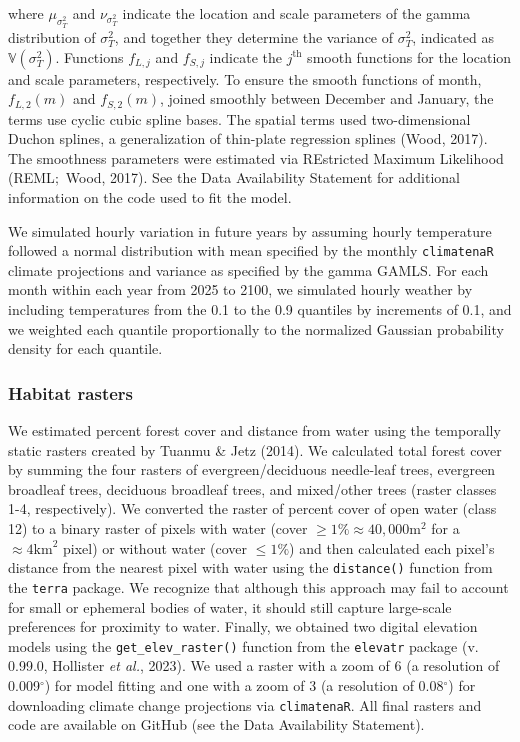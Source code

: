 \documentclass[
  12pt,
]{article}
\begin{document}
\noindent where \(\mu_{\sigma^2_T}\) and \(\nu_{\sigma^2_T}\) indicate the location and scale parameters of the gamma distribution of \(\sigma^2_T\), and together they determine the variance of \(\sigma^2_T\), indicated as \(\mathbb V(\sigma^2_T)\). Functions \(f_{L,j}\) and \(f_{S,j}\) indicate the \(j^\text{th}\) smooth functions for the location and scale parameters, respectively. To ensure the smooth functions of month, \(f_{L,2}(m)\) and \(f_{S,2}(m)\), joined smoothly between December and January, the terms use cyclic cubic spline bases. The spatial terms used two-dimensional Duchon splines, a generalization of thin-plate regression splines (Wood, 2017). The smoothness parameters were estimated via REstricted Maximum Likelihood (REML\(;\) Wood, 2017). See the Data Availability Statement for additional information on the code used to fit the model.

We simulated hourly variation in future years by assuming hourly temperature followed a normal distribution with mean specified by the monthly \texttt{climatenaR} climate projections and variance as specified by the gamma GAMLS. For each month within each year from 2025 to 2100, we simulated hourly weather by including temperatures from the 0.1 to the 0.9 quantiles by increments of 0.1, and we weighted each quantile proportionally to the normalized Gaussian probability density for each quantile.

\subsubsection{Habitat rasters}\label{habitat-rasters}

\noindent We estimated percent forest cover and distance from water using the temporally static rasters created by Tuanmu \& Jetz (2014). We calculated total forest cover by summing the four rasters of evergreen/deciduous needle-leaf trees, evergreen broadleaf trees, deciduous broadleaf trees, and mixed/other trees (raster classes 1-4, respectively). We converted the raster of percent cover of open water (class 12) to a binary raster of pixels with water (cover \(\ge 1\% \approx 40,000 \text{m}^2\) for a \(\approx 4 \text{km}^2\) pixel) or without water (cover \(\le 1\%\)) and then calculated each pixel's distance from the nearest pixel with water using the \texttt{distance()} function from the \texttt{terra} package. We recognize that although this approach may fail to account for small or ephemeral bodies of water, it should still capture large-scale preferences for proximity to water. Finally, we obtained two digital elevation models using the \texttt{get\_elev\_raster()} function from the \texttt{elevatr} package (v. 0.99.0, Hollister \emph{et al.}, 2023). We used a raster with a zoom of 6 (a resolution of 0.009\(^\circ\)) for model fitting and one with a zoom of 3 (a resolution of 0.08\(^\circ\)) for downloading climate change projections via \texttt{climatenaR}. All final rasters and code are available on GitHub (see the Data Availability Statement).
\end{document}
